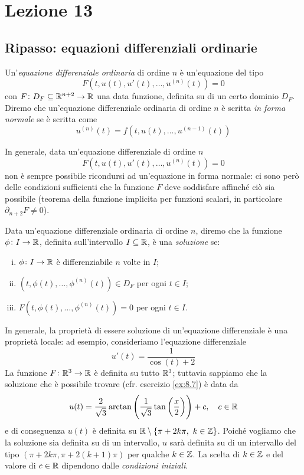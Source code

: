 \section{Lezione 13}
\subsection{Ripasso: equazioni differenziali ordinarie}
\begin{definition}
    \label{def:11.1}
    Un'\emph{equazione differenziale ordinaria} di ordine $n$ è un'equazione del tipo
    \[
    F(t, u(t), u'(t), \dots, u^{(n)}(t)) = 0
    \]
    con $F\colon D_F\subseteq \amsbb{R}^{n+2}\to \amsbb{R}$ una data funzione, definita su di un certo dominio $D_F$.\\
    Diremo che un'equazione differenziale ordinaria di ordine $n$ è scritta \emph{in forma normale} se è scritta come
    \[
    u^{(n)}(t) = f(t, u(t), \dots, u^{(n-1)}(t))
    \]
\end{definition}
\begin{remark}
    In generale, data un'equazione differenziale di ordine $n$
    \[
    F(t, u(t), u'(t), \dots, u^{(n)}(t))=0
    \]
    non è sempre possibile ricondursi ad un'equazione in forma normale: ci sono però delle condizioni sufficienti che la funzione $F$ deve soddisfare affinché ciò sia possibile (teorema della funzione implicita per funzioni scalari, in particolare $\partial_{n+2}F \ne 0$).
\end{remark}
\begin{definition}
    \label{def:11.2}
    Data un'equazione differenziale ordinaria di ordine $n$, diremo che la funzione $\phi\colon I \to \amsbb{R}$, definita sull'intervallo $I\subseteq \amsbb{R}$, è una \emph{soluzione} se:
    \begin{enumerate}[(i)]
        \item $\phi\colon I \to \amsbb{R}$ è differenziabile $n$ volte in $I$;
        \item $(t, \phi(t), \dots, \phi^{(n)}(t))\in D_F$ per ogni $t\in I$;
        \item $F(t, \phi(t), \dots, \phi^{(n)}(t))=0$ per ogni $t\in I$.
    \end{enumerate}
\end{definition}
\begin{remark}
    In generale, la proprietà di essere soluzione di un'equazione differenziale è una proprietà locale: ad esempio, consideriamo l'equazione differenziale
    \[
    u'(t) = \frac{1}{\cos(t)+2}
    \]
    La funzione $F\colon \amsbb{R}^3\to \amsbb{R}$ è definita su tutto $\amsbb{R}^3$; tuttavia sappiamo che la soluzione che è possibile trovare (cfr. esercizio \ref{ex:8.7}) è data da
    \[
    u(t) = \frac{2}{\sqrt{3}}\arctan\left(\frac{1}{\sqrt{3}}\tan\left(\frac{x}{2}\right)\right)+c, \quad c\in\amsbb{R}
    \]
    e di conseguenza $u(t)$ è definita su $\amsbb{R}\setminus\{\pi + 2k\pi, \ k\in\amsbb{Z}\}$. Poiché vogliamo che la soluzione sia definita su di un intervallo, $u$ sarà definita su di un intervallo del tipo $(\pi + 2k\pi, \pi + 2(k+1)\pi)$ per qualche $k\in\amsbb{Z}$. La scelta di $k\in\amsbb{Z}$ e del valore di $c\in\amsbb{R}$ dipendono dalle \emph{condizioni iniziali}.
\end{remark}
